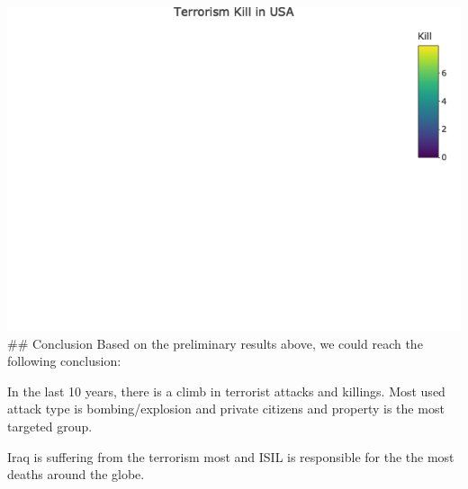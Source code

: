 \documentclass[
]{article}
\begin{document}
\includegraphics{README_files/figure-gfm/unnamed-chunk-17-1.png} \#\#
Conclusion Based on the preliminary results above, we could reach the
following conclusion:

In the last 10 years, there is a climb in terrorist attacks and
killings. Most used attack type is bombing/explosion and private
citizens and property is the most targeted group.

Iraq is suffering from the terrorism most and ISIL is responsible for
the the most deaths around the globe.
\end{document}
